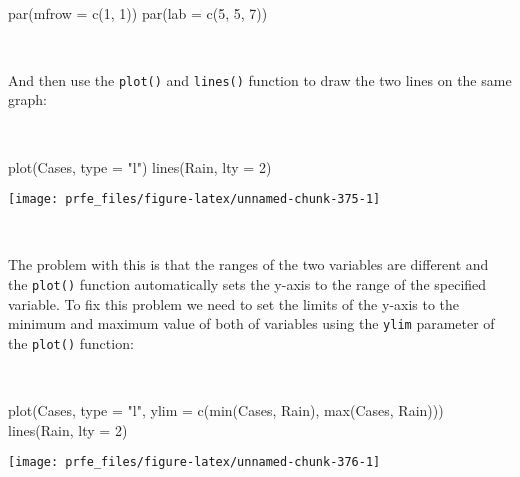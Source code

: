 \documentclass[
  12pt,
  a4paper]{book}
\newenvironment{Shaded}{\begin{snugshade}}{\end{snugshade}}
\newcommand{\AttributeTok}[1]{\textcolor[rgb]{0.77,0.63,0.00}{#1}}
\newcommand{\DecValTok}[1]{\textcolor[rgb]{0.00,0.00,0.81}{#1}}
\newcommand{\FunctionTok}[1]{\textcolor[rgb]{0.00,0.00,0.00}{#1}}
\newcommand{\NormalTok}[1]{#1}
\newcommand{\StringTok}[1]{\textcolor[rgb]{0.31,0.60,0.02}{#1}}
\begin{document}
~

\begin{Shaded}
\begin{Highlighting}[]
\FunctionTok{par}\NormalTok{(}\AttributeTok{mfrow =} \FunctionTok{c}\NormalTok{(}\DecValTok{1}\NormalTok{, }\DecValTok{1}\NormalTok{))}
\FunctionTok{par}\NormalTok{(}\AttributeTok{lab =} \FunctionTok{c}\NormalTok{(}\DecValTok{5}\NormalTok{, }\DecValTok{5}\NormalTok{, }\DecValTok{7}\NormalTok{))}
\end{Highlighting}
\end{Shaded}

~

And then use the \texttt{plot()} and \texttt{lines()} function to draw the two lines on the same graph:

~

\begin{Shaded}
\begin{Highlighting}[]
\FunctionTok{plot}\NormalTok{(Cases, }\AttributeTok{type =} \StringTok{"l"}\NormalTok{)}
\FunctionTok{lines}\NormalTok{(Rain, }\AttributeTok{lty =} \DecValTok{2}\NormalTok{)}
\end{Highlighting}
\end{Shaded}

\begin{center}\texttt{[image: prfe\_files/figure-latex/unnamed-chunk-375-1]} \end{center}

~

The problem with this is that the ranges of the two variables are different and the \texttt{plot()} function automatically sets the y-axis to the range of the specified variable. To fix this problem we need to set the limits of the y-axis to the minimum and maximum value of both of variables using the \texttt{ylim} parameter of the \texttt{plot()} function:

~

\begin{Shaded}
\begin{Highlighting}[]
\FunctionTok{plot}\NormalTok{(Cases, }\AttributeTok{type =} \StringTok{"l"}\NormalTok{, }\AttributeTok{ylim =} \FunctionTok{c}\NormalTok{(}\FunctionTok{min}\NormalTok{(Cases, Rain), }\FunctionTok{max}\NormalTok{(Cases, Rain)))}
\FunctionTok{lines}\NormalTok{(Rain, }\AttributeTok{lty =} \DecValTok{2}\NormalTok{)}
\end{Highlighting}
\end{Shaded}

\begin{center}\texttt{[image: prfe\_files/figure-latex/unnamed-chunk-376-1]} \end{center}
\end{document}
